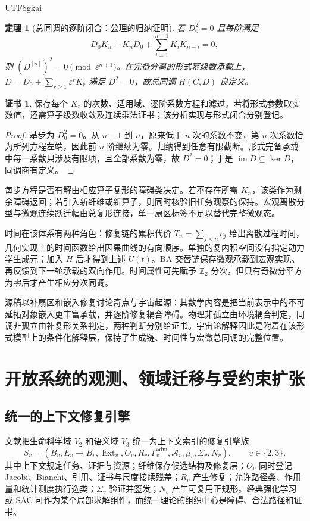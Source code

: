 \documentclass[11pt,a4paper]{article}
\theoremstyle{plain}
\newtheorem{theorem}{定理}[section]
\theoremstyle{definition}
\newtheorem*{certificate}{证书}
\theoremstyle{remark}
\begin{document}
\begin{CJK*}{UTF8}{gkai}
\begin{theorem}[总同调的逐阶闭合：公理的归纳证明]
\label{ss:total}
若 $D_0^2=0$ 且每阶满足
\[
 D_0K_n+K_nD_0+\sum_{i=1}^{n-1}K_iK_{n-i}=0,
\]
则 $(D^{[n]})^2=0\pmod{\varepsilon^{n+1}}$。在完备分离的形式幂级数承载上，$D=D_0+\sum_{r\ge1}\varepsilon^rK_r$ 满足 $D^2=0$，故总同调 $H(C,D)$ 良定义。
\end{theorem}
\begin{certificate}
保存每个 $K_r$ 的次数、适用域、逐阶系数方程和滤过。若将形式参数取实数值，还需算子级数收敛及连续乘法证书；该分析实现与形式闭合分别登记。
\end{certificate}
\begin{proof}
基步为 $D_0^2=0$。从 $n-1$ 到 $n$，原来低于 $n$ 次的系数不变，第 $n$ 次系数恰为所列方程左端，因此前 $n$ 阶继续为零。归纳得到任意有限截断。形式完备承载中每一系数只涉及有限项，且全部系数为零，故 $D^2=0$；于是 $\operatorname{im}D\subseteq\ker D$，同调商有定义。
\end{proof}

每步方程是否有解由相应算子复形的障碍类决定。若不存在所需 $K_n$，该类作为剩余障碍返回；若引入新纤维或新算子，则同时核验旧任务观察的保持。宏观离散分型与微观连续跃迁幅由总复形连接，单一扇区标签不足以替代完整微观态。

时间在该体系有两种角色：修复链的累积代价 $T_n=\sum_{j<n}c_j$ 给出离散过程时间，几何实现上的时间函数给出因果曲线的有向顺序。单独的复内积空间没有指定动力学生成元；加入 $H$ 后才得到上述 $U(t)$。BA 交替链保存微观承载到宏观实现、再反馈到下一轮承载的双向作用。时间属性可先赋予 $\mathbb Z_2$ 分次，但只有奇微分平方为零后才产生相应分次同调。

源稿以补扇区和嵌入修复讨论奇点与宇宙起源：其数学内容是把当前表示中的不可延拓对象嵌入更丰富承载，并逐阶修复耦合障碍。物理非孤立由环境耦合判定，同调非孤立由补复形关系判定，两种判断分别给证书。宇宙论解释因此是附着在该形式模型上的条件化解释层，保持了生成链、时间性与宏微总同调的完整位置。

\section{开放系统的观测、领域迁移与受约束扩张}
\label{ss:open}

\subsection{统一的上下文修复引擎}

文献\cite{S25}把生命科学域 $V_2$ 和语义域 $V_3$ 统一为上下文索引的修复引擎族
\[
 S_v=(B_v,E_v\to B_v,\operatorname{Ext}_v,O_v,R_v,
      \Gamma_v^{\mathrm{adm}},\mathcal A_v,\mu_v,\Sigma_v,N_v),
 \qquad v\in\{2,3\}.
\]
其中上下文规定任务、证据与资源；纤维保存候选结构及修复层；$O_v$ 同时登记 Jacobi、Bianchi、引用、证书与尺度接续残差；$R_v$ 产生修复；允许路径类、作用量和统计测度执行选类；$\Sigma_v$ 验证并签发；$N_v$ 产生可复用正规形。经典强化学习或 SAC 可作为某个局部求解组件，而统一理论的组织中心是障碍、合法路径和证书。


\end{CJK*}
\end{document}
